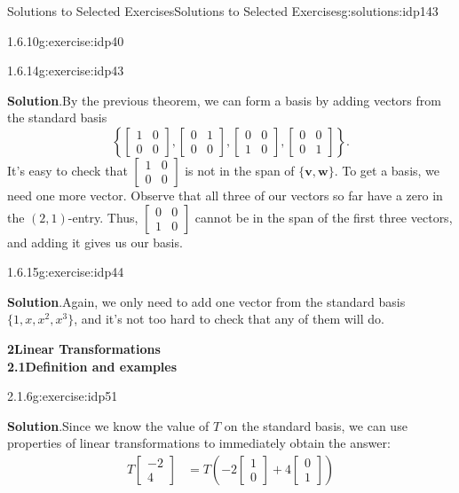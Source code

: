 \documentclass[oneside,10pt,]{book}
\newcommand{\blocktitlefont}{\relax}
\numberwithin{equation}{section}
\newcommand{\bbm}{\begin{bmatrix}}
\newcommand{\ebm}{\end{bmatrix}}
\newcommand{\vv}{\mathbf{v}}
\newcommand{\ww}{\mathbf{w}}
\newcommand{\amp}{&}
\begin{document}
\begin{solutions-chapter}{Solutions to Selected Exercises}{}{Solutions to Selected Exercises}{}{}{g:solutions:idp143}
\begin{inlinesolution}{1.6.10}{}{g:exercise:idp40}
\begin{enumerate}[label=\alph*]
\end{enumerate}
%
\end{inlinesolution}%
\begin{inlinesolution}{1.6.14}{}{g:exercise:idp43}%
\par\smallskip%
\noindent\textbf{\blocktitlefont Solution}.\hypertarget{g:solution:idp154-back}{}\quad{}By the previous theorem, we can form a basis by adding vectors from the standard basis%
\begin{equation*}
\left\{\bbm 1\amp 0\\0\amp 0\ebm, \bbm 0\amp 1\\0\amp 0\ebm, \bbm 0\amp 0\\1\amp 0\ebm, \bbm 0\amp 0\\0\amp 1\ebm\right\}\text{.}
\end{equation*}
It's easy to check that \(\bbm 1\amp 0\\0\amp 0\ebm\) is not in the span of \(\{\vv,\ww\}\). To get a basis, we need one more vector. Observe that all three of our vectors so far have a zero in the \((2,1)\)-entry. Thus, \(\bbm 0\amp 0\\1\amp 0\ebm\) cannot be in the span of the first three vectors, and adding it gives us our basis.%
\end{inlinesolution}%
\begin{inlinesolution}{1.6.15}{}{g:exercise:idp44}%
\par\smallskip%
\noindent\textbf{\blocktitlefont Solution}.\hypertarget{g:solution:idp155-back}{}\quad{}Again, we only need to add one vector from the standard basis \(\{1,x,x^2,x^3\}\), and it's not too hard to check that any of them will do.%
\end{inlinesolution}%
\par\medskip
\noindent\textbf{\Large{}2\space\textperiodcentered\space{}Linear Transformations\\
2.1\space\textperiodcentered\space{}Definition and examples}
\begin{inlinesolution}{2.1.6}{}{g:exercise:idp51}%
\par\smallskip%
\noindent\textbf{\blocktitlefont Solution}.\hypertarget{g:solution:idp156-back}{}\quad{}Since we know the value of \(T\) on the standard basis, we can use properties of linear transformations to immediately obtain the answer:%
\begin{align*}
T\bbm -2\\4\ebm \amp= T\left(-2\bbm 1\\0\ebm +4\bbm 0\\1\ebm\right)\\

\end{align*}
\end{inlinesolution}
\end{solutions-chapter}
\end{document}
